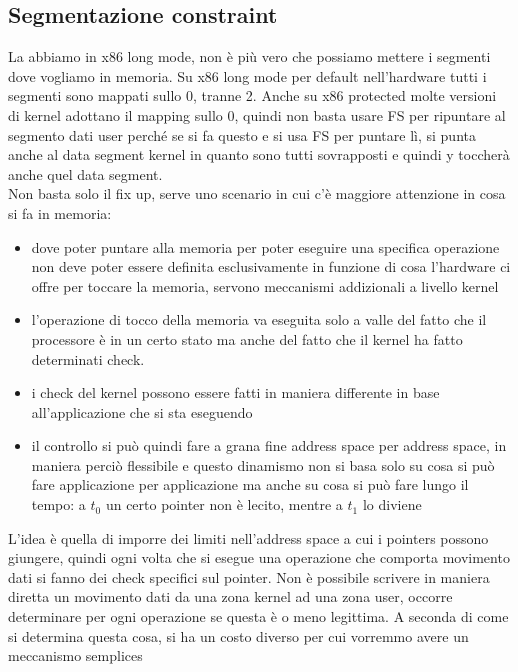 \documentclass[12pt, oneside]{extbook}
\begin{document}
\subsection{Segmentazione constraint}
La abbiamo in x86 long mode, non è più vero che possiamo mettere i segmenti dove vogliamo in memoria. Su x86 long mode per default nell'hardware tutti i segmenti sono mappati sullo 0, tranne 2. Anche su x86 protected molte versioni di kernel adottano il mapping sullo 0, quindi non basta usare FS per ripuntare al segmento dati user perché se si fa questo e si usa FS per puntare lì, si punta anche al data segment kernel in quanto sono tutti sovrapposti e quindi y toccherà anche quel data segment.\\Non basta solo il fix up, serve uno scenario in cui c'è maggiore attenzione in cosa si fa in memoria:
\begin{itemize}
\item dove poter puntare alla memoria per poter eseguire una specifica operazione non deve poter essere definita esclusivamente in funzione di cosa l'hardware ci offre per toccare la memoria, servono meccanismi addizionali a livello kernel
\item l'operazione di tocco della memoria va eseguita solo a valle del fatto che il processore è in un certo stato ma anche del fatto che il kernel ha fatto determinati check.
\item i check del kernel possono essere fatti in maniera differente in base all'applicazione che si sta eseguendo
\item il controllo si può quindi fare a grana fine address space per address space, in maniera perciò flessibile e questo dinamismo non si basa solo su cosa si può fare applicazione per applicazione ma anche su cosa si può fare lungo il tempo: a $t_0$ un certo pointer non è lecito, mentre a $t_1$ lo diviene
\end{itemize}
L'idea è quella di imporre dei limiti nell'address space a cui i pointers possono giungere, quindi ogni volta che si esegue una operazione che comporta movimento dati si fanno dei check specifici sul pointer. Non è possibile scrivere in maniera diretta un movimento dati da una zona kernel ad una zona user, occorre determinare per ogni operazione se questa è o meno legittima. A seconda di come si determina questa cosa, si ha un costo diverso per cui vorremmo avere un meccanismo semplices
\end{document}
